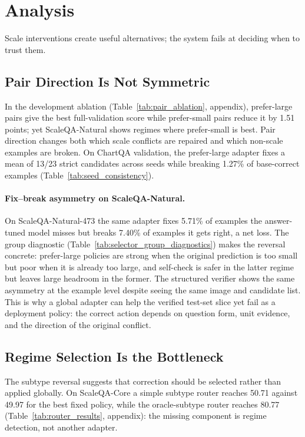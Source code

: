\section{Analysis}
\label{sec:analysis}

Scale interventions create useful alternatives; the system fails at deciding when to trust them.

\subsection{Pair Direction Is Not Symmetric}


In the development ablation (Table~\ref{tab:pair_ablation}, appendix), prefer-large pairs give the best full-validation score while prefer-small pairs reduce it by 1.51 points; yet ScaleQA-Natural shows regimes where prefer-small is best. Pair direction changes both which scale conflicts are repaired and which non-scale examples are broken. On ChartQA validation, the prefer-large adapter fixes a mean of 13/23 strict candidates across seeds while breaking 1.27\% of base-correct examples (Table~\ref{tab:seed_consistency}).

\paragraph{Fix--break asymmetry on ScaleQA-Natural.}
On ScaleQA-Natural-473 the same adapter fixes 5.71\% of examples the answer-tuned model misses but breaks 7.40\% of examples it gets right, a net loss. The group diagnostic (Table~\ref{tab:selector_group_diagnostics}) makes the reversal concrete: prefer-large policies are strong when the original prediction is too small but poor when it is already too large, and self-check is safer in the latter regime but leaves large headroom in the former. The structured verifier shows the same asymmetry at the example level despite seeing the same image and candidate list. This is why a global adapter can help the verified test-set slice yet fail as a deployment policy: the correct action depends on question form, unit evidence, and the direction of the original conflict.

\subsection{Regime Selection Is the Bottleneck}
\label{sec:selector}


The subtype reversal suggests that correction should be selected rather than applied globally. On ScaleQA-Core a simple subtype router reaches 50.71 against 49.97 for the best fixed policy, while the oracle-subtype router reaches 80.77 (Table~\ref{tab:router_results}, appendix): the missing component is regime detection, not another adapter.

